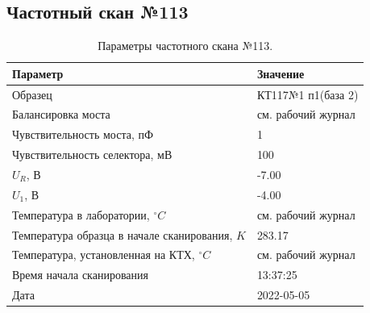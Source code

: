 \subsection{Частотный скан №113}
\begin{table}[!ht]
    \centering
    \caption{Параметры частотного скана №113.}
    \begin{tabular}{|l|l|}
        \hline
        Параметр                                       & Значение                  \\ \hline
        Образец                                        & КТ117№1 п1(база 2)        \\ \hline
        Балансировка моста                             & см. рабочий журнал        \\ \hline
        Чувствительность моста, пФ                     & 1                         \\ \hline
        Чувствительность селектора, мВ                 & 100                       \\ \hline
        $U_R$, В                                       & -7.00                     \\ \hline
        $U_1$, В                                       & -4.00                     \\ \hline
        Температура в лаборатории, $^\circ C$          & см. рабочий журнал        \\ \hline
        Температура образца в начале сканирования, $K$ & 283.17                    \\ \hline
        Температура, установленная на КТХ, $^\circ C$  & см. рабочий журнал        \\ \hline
        Время начала сканирования                      & 13:37:25                  \\ \hline
        Дата                                           & 2022-05-05                \\ \hline
    \end{tabular}
    \label{table:frequency_scan_113}
\end{table}

